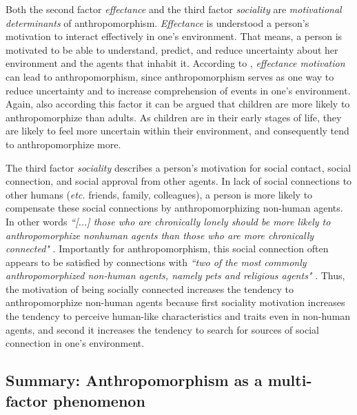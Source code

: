 \documentclass{frontiersSCNS} %
\newcommand{\etc}{\textit{etc.}\xspace}
\begin{document}
Both the second factor \textit{effectance} and the third factor
\textit{sociality} are \emph{motivational determinants} of anthropomorphism.
\textit{Effectance} is understood a person's motivation to interact effectively
in one's environment. That means, a person is motivated to be able to
understand, predict, and reduce uncertainty about her environment and the agents
that inhabit it. According to \cite{epley_seeing_2007}, \textit{effectance
motivation} can lead to anthropomorphism, since anthropomorphism serves as one
way to reduce uncertainty and to increase comprehension of events in one's
environment. Again, also according this factor it can be argued that children
are more likely to anthropomorphize than adults. As children are in their early
stages of life, they are likely to feel more uncertain within their environment,
and consequently tend to anthropomorphize more.

The third factor \textit{sociality} describes a person's motivation for social
contact, social connection, and social approval from other agents. In lack of
social connections to other humans (\etc friends, family, colleagues), a person
is more likely to compensate these social connections by anthropomorphizing
non-human agents. In other words \textit{``[...] those who are chronically
lonely should be more likely to anthropomorphize nonhuman agents than those who
are more chronically connected"} \citep{epley_seeing_2007}. Importantly for
anthropomorphism, this social connection often appears to be satisfied by
connections with \textit{``two of the most commonly anthropomorphized non-human
agents, namely pets and religious agents"} \citep{epley_seeing_2007}. Thus, the
motivation of being socially connected increases the tendency to
anthropomorphize non-human agents because first sociality motivation increases
the tendency to perceive human-like characteristics and traits even in non-human
agents, and second it increases the tendency to search for sources of social
connection in one's environment.

%
%
%
%
%
%



\subsection{Summary: Anthropomorphism as a multi-factor phenomenon}
\label{sec:multi-factors}
\end{document}
